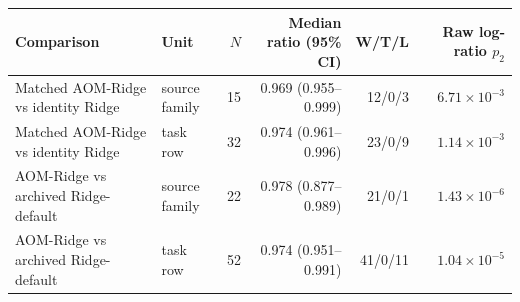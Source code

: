 \begin{tabularx}{\linewidth}{XXrrrr}
\toprule
Comparison & Unit & $N$ & Median ratio (95\% CI) & W/T/L & Raw log-ratio $p_2$ \\
\midrule
Matched AOM-Ridge vs identity Ridge & source family & 15 & 0.969 (0.955--0.999) & 12/0/3 & $6.71\times10^{-3}$ \\
Matched AOM-Ridge vs identity Ridge & task row & 32 & 0.974 (0.961--0.996) & 23/0/9 & $1.14\times10^{-3}$ \\
AOM-Ridge vs archived Ridge-default & source family & 22 & 0.978 (0.877--0.989) & 21/0/1 & $1.43\times10^{-6}$ \\
AOM-Ridge vs archived Ridge-default & task row & 52 & 0.974 (0.951--0.991) & 41/0/11 & $1.04\times10^{-5}$ \\
\bottomrule
\end{tabularx}
